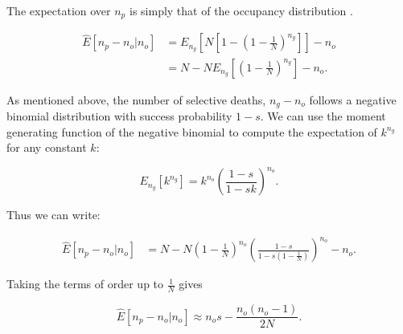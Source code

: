 \documentclass[review,nonatbib]{elsarticle}
\newcommand{\sgcomment}[1]{{\color{red}{SG: #1}}}
\begin{document}
The expectation over $n_p$ is simply that of the occupancy distribution \cite{Wakeley2009}.

\begin{equation*}
  \begin{aligned}
    \label{eq_lineages_derive}
    \hat{E}[n_p -n_o | n_o]
    & =   E_{n_g}\left[N\left[1-\left(1 - \frac{1}{N} \right)^{n_g} \right]\right]- n_o\\
    & =   N-N  E_{n_g}\left[\left(1 - \frac{1}{N} \right)^{n_g} \right] -n_o.
  \end{aligned}
\end{equation*}

As mentioned above, the number of selective deaths, $n_g-n_o$ follows a negative binomial
distribution with success probability $1-s$. We can use the moment generating function of the
negative binomial to compute the expectation of $k^{n_g}$ for any constant $k$:

\begin{equation}
  E_{n_g}[k^{n_g}] = k^{n_o}  \left(\frac{1-s}{1-sk}\right)^{n_o}.
  \label{eq_identity}
\end{equation}

Thus we can write:



\begin{equation}
  \begin{aligned}
    \label{eq_gauss_mean}
    \hat{E}[n_p -n_o | n_o] &= N-N\left( 1 - \frac{1}{N} \right)^{n_o}\left( \frac{1-s}{1-s \left( 1 - \frac{1}{N} \right)}\right)^{n_o}-n_o.
  \end{aligned}
\end{equation}

Taking the terms of order up to $\frac{1}{N}$ gives

\begin{equation}
    \label{eq_lineages_approx}
    \hat{E}[n_p-n_o | n_o] \approx n_o  s - \frac{n_o (n_o-1) }{2N}.
\end{equation}
\end{document}

